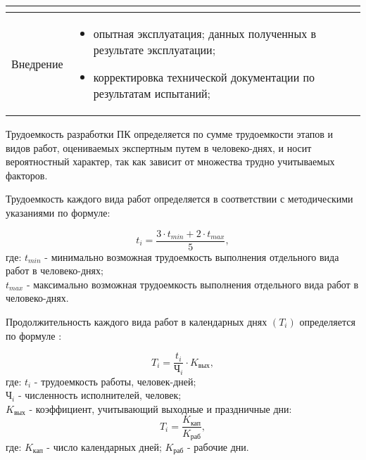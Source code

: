 \begin{center}
\begin{longtable}{|l|l|}
\begin{parbox}{5in}
				\end{parbox} \\
	\hline
		Внедрение & \begin{parbox}{5in} {
					\begin{itemize}
						\item опытная эксплуатация;
						 данных полученных в результате эксплуатации;
						\item корректировка технической документации по результатам испытаний;
					\end{itemize} }
				\end{parbox} \\
\end{longtable}
\end{center}

Трудоемкость разработки ПК определяется по сумме трудоемкости этапов и видов работ, оцениваемых экспертным путем в
человеко-днях, и носит вероятностный характер, так как зависит от множества трудно учитываемых факторов.

Трудоемкость каждого вида работ определяется в соответствии с методическими указаниями \cite{bibl53} по формуле:

\begin{equation}
t_i = \frac{3\cdot{t_{min}} + 2\cdot{t_{max}}}{5},
\label{eq:eco1}
\end{equation}
где:	$t_{min}$ - минимально возможная трудоемкость выполнения отдельного вида работ в человеко-днях; \\
	$t_{max}$ - максимально возможная трудоемкость выполнения отдельного вида работ в человеко-днях.

Продолжительность каждого вида работ в календарных днях ${(T_i)}$ определяется по формуле \cite{bibl53}:

\begin{equation}
T_i = \frac{t_i}{\mbox{Ч}_i}\cdot{K_{\mbox{вых}}},
\label{eq:eco2}
\end{equation}
где:	${t_i}$ - трудоемкость работы, человек-дней; \\
	${\mbox{Ч}_i}$ - численность исполнителей, человек; \\
	${K_{\mbox{вых}}}$ - коэффициент, учитывающий выходные и праздничные дни: \\

\begin{equation}
T_i = \frac{K_{\mbox{кап}}}{K_{\mbox{раб}}},
\label{eq:eco3}
\end{equation}
где:	${K_{\mbox{кап}}}$ - число календарных дней;
	${K_{\mbox{раб}}}$ - рабочие дни.

